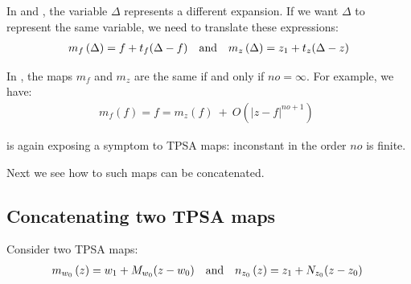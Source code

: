 \documentclass{hitec}     %
\begin{document}
{{{{In  and , the variable $\Delta $ represents a different expansion. If we want $\Delta $ to represent  the same variable, we need to translate these expressions:
%
\begin{align} {m}_{f}\left({\Delta }\right)=f+{t}_{f}(\Delta -f)~~~{\rm a}{\rm n}{\rm d} ~~~{m}_{z}\left({\Delta }\right)={z}_{1}+{t}_{z}(\Delta -z) \label{eq:fixtmapf} \end{align}


In , the maps $m_f$ and $m_z$ are the same if and only if $no=\infty$.  For example, we have:
%
\begin{align} {m}_{f}\left({f}\right)=f=
{m}_{z}\left({f}\right)\ +\ O({\left|{z-f}\right|}^{no+1})~\ \label{eq:fixtmapfe} \end{align}

 is again exposing a symptom to TPSA maps: inconstant in the order ${no}$ is finite.

Next we see how to such maps can be concatenated.

\subsection{Concatenating two TPSA maps}\label{s:concattpsa}
 
 Consider two TPSA maps:
%
\begin{align} {m}_{{w}_{0}}\left({z}\right)={w}_{1}+{M}_{{w}_{0}}(z-{w}_{0})~~~{\rm a}{\rm n}{\rm d} ~~~{n}_{{z}_{0}}\left({z}\right)={z}_{1}+{N}_{{z}_{0}}(z-{z}_{0}) \label{eq:concatt} \ \end{align}


}}}}
\end{document}

